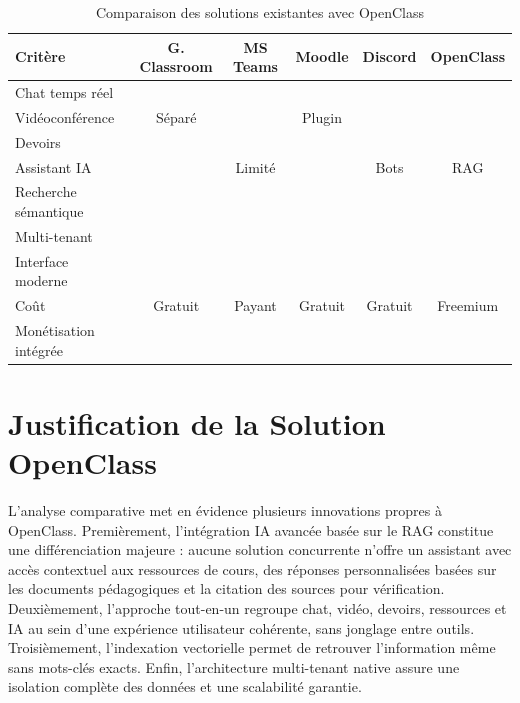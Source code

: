 \documentclass[12pt, a4paper, twoside]{report}
\newcommand{\cmark}{\ding{51}}
\newcommand{\xmark}{\ding{55}}
\begin{document}
\begin{table}[H]
  
  \begin{tabularx}{\textwidth}{|X|c|c|c|c|c|}
    \hline
    \textbf{Critère} & \textbf{G. Classroom} & \textbf{MS Teams}
      & \textbf{Moodle} & \textbf{Discord} & \textbf{OpenClass} \\
    \hline
    Chat temps réel       & \xmark & \cmark & \xmark  & \cmark  & \cmark \\
    Vidéoconférence       & Séparé & \cmark & Plugin  & \cmark  & \cmark \\
    Devoirs               & \cmark & \cmark & \cmark  & \xmark  & \cmark \\
    Assistant IA          & \xmark & Limité & \xmark  & Bots    & \cmark RAG \\
    Recherche sémantique  & \xmark & \xmark & \xmark  & \xmark  & \cmark \\
    Multi-tenant          & \xmark & \cmark & \cmark  & \cmark  & \cmark \\
    Interface moderne     & \cmark & ~      & \xmark  & \cmark  & \cmark \\
    Coût                  & Gratuit & Payant & Gratuit & Gratuit & Freemium \\
    Monétisation intégrée & \xmark & \cmark & \xmark  & \xmark  & \cmark \\
    \hline
  \end{tabularx}
  \caption{Comparaison des solutions existantes avec OpenClass}
  \label{tab:comparison}
\end{table}

\section{Justification de la Solution OpenClass}

L'analyse comparative met en évidence plusieurs innovations propres à OpenClass.
Premièrement, l'intégration IA avancée basée sur le RAG constitue une différenciation
majeure : aucune solution concurrente n'offre un assistant avec accès contextuel
aux ressources de cours, des réponses personnalisées basées sur les documents
pédagogiques et la citation des sources pour vérification. Deuxièmement, l'approche
tout-en-un regroupe chat, vidéo, devoirs, ressources et IA au sein d'une expérience
utilisateur cohérente, sans jonglage entre outils. Troisièmement, l'indexation
vectorielle permet de retrouver l'information même sans mots-clés exacts. Enfin,
l'architecture multi-tenant native assure une isolation complète des données et une
scalabilité garantie.
\end{document}
